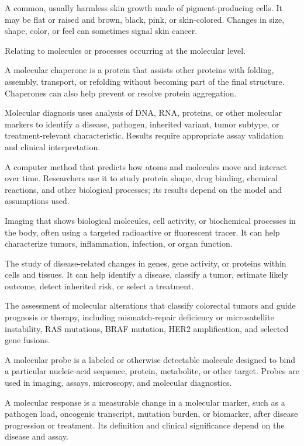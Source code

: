  A common, usually harmless skin growth made of pigment-producing cells. It may be flat or raised and brown, black, pink, or skin-colored. Changes in size, shape, color, or feel can sometimes signal skin cancer.

 Relating to molecules or processes occurring at the molecular level.

 A molecular chaperone is a protein that assists other proteins with folding, assembly, transport, or refolding without becoming part of the final structure. Chaperones can also help prevent or resolve protein aggregation.

 Molecular diagnosis uses analysis of DNA, RNA, proteins, or other molecular markers to identify a disease, pathogen, inherited variant, tumor subtype, or treatment-relevant characteristic. Results require appropriate assay validation and clinical interpretation.

 A computer method that predicts how atoms and molecules move and interact over time. Researchers use it to study protein shape, drug binding, chemical reactions, and other biological processes; its results depend on the model and assumptions used.

 Imaging that shows biological molecules, cell activity, or biochemical processes in the body, often using a targeted radioactive or fluorescent tracer. It can help characterize tumors, inflammation, infection, or organ function.

 The study of disease-related changes in genes, gene activity, or proteins within cells and tissues. It can help identify a disease, classify a tumor, estimate likely outcome, detect inherited risk, or select a treatment.

 The assessment of molecular alterations that classify colorectal tumors and guide prognosis or therapy, including mismatch-repair deficiency or microsatellite instability, RAS mutations, BRAF mutation, HER2 amplification, and selected gene fusions.

 A molecular probe is a labeled or otherwise detectable molecule designed to bind a particular nucleic-acid sequence, protein, metabolite, or other target. Probes are used in imaging, assays, microscopy, and molecular diagnostics.

 A molecular response is a measurable change in a molecular marker, such as a pathogen load, oncogenic transcript, mutation burden, or biomarker, after disease progression or treatment. Its definition and clinical significance depend on the disease and assay.

